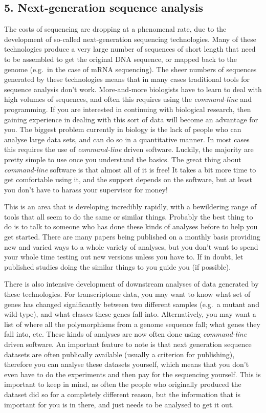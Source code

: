 \documentclass[]{article}
\begin{document}
\subsection{5. Next-generation sequence
analysis}\label{next-generation-sequence-analysis}

The costs of sequencing are dropping at a phenomenal rate, due to the
development of so-called next-generation sequencing technologies. Many
of these technologies produce a very large number of sequences of short
length that need to be assembled to get the original DNA sequence, or
mapped back to the genome (e.g.~in the case of mRNA sequencing). The
sheer numbers of sequences generated by these technologies means that in
many cases traditional tools for sequence analysis don't work.
More-and-more biologists have to learn to deal with high volumes of
sequences, and often this requires using the \emph{command-line} and
programming. If you are interested in continuing with biological
research, then gaining experience in dealing with this sort of data will
become an advantage for you. The biggest problem currently in biology is
the lack of people who can analyse large data sets, and can do so in a
quantitative manner. In most cases this requires the use of
\emph{command-line} driven software. Luckily, the majority are pretty
simple to use once you understand the basics. The great thing about
\emph{command-line} software is that almost all of it is free! It takes
a bit more time to get comfortable using it, and the support depends on
the software, but at least you don't have to harass your supervisor for
money!

This is an area that is developing incredibly rapidly, with a
bewildering range of tools that all seem to do the same or similar
things. Probably the best thing to do is to talk to someone who has done
these kinds of analyses before to help you get started. There are many
papers being published on a monthly basis providing new and varied ways
to a whole variety of analyses, but you don't want to spend your whole
time testing out new versions unless you have to. If in doubt, let
published studies doing the similar things to you guide you (if
possible).

There is also intensive development of downstream analyses of data
generated by these technologies. For transcriptome data, you may want to
know what set of genes has changed significantly between two different
samples (e.g.~a mutant and wild-type), and what classes these genes fall
into. Alternatively, you may want a list of where all the polymorphisms
from a genome sequence fall; what genes they fall into, etc. These kinds
of analyses are now often done using \emph{command-line} driven
software. An important feature to note is that next generation sequence
datasets are often publically available (usually a criterion for
publishing), therefore you can analyse these datasets yourself, which
means that you don't even have to do the experiments and then pay for
the sequencing yourself. This is important to keep in mind, as often the
people who originally produced the dataset did so for a completely
different reason, but the information that is important for you is in
there, and just needs to be analysed to get it out.
\end{document}
